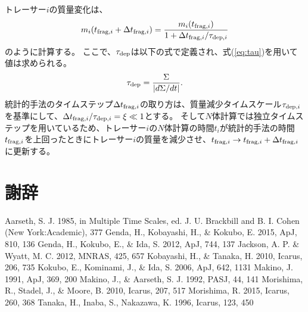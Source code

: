 \documentclass[a4paper,10pt,oneside,twocolumn,notitlepage,final]{jarticle}
\begin{document}
トレーサー$i$の質量変化は、
\begin{align}
 m_i(t_{{\rm frag},i} + \Delta t_{{\rm frag},i}) = \frac{m_i(t_{{\rm frag},i})}{1 + \Delta t_{{\rm frag},i}/\tau_{{\rm dep},i}}
\end{align}
のように計算する。
ここで、$\tau_{\rm dep}$は以下の式で定義され、式(\ref{eq:tau})を用いて値は求められる。
\begin{align}
 \tau_{\rm dep} = \frac{\Sigma}{|d \Sigma/ dt|}.
\end{align}
統計的手法のタイムステップ$\Delta t_{{\rm frag},i}$の取り方は、質量減少タイムスケール$\tau_{{\rm dep},i}$を基準にして、$\Delta t_{{\rm frag},i}/\tau_{{\rm dep},i} = \xi \ll 1$とする。
そして$N$体計算では独立タイムステップを用いているため、トレーサー$i$の$N$体計算の時間$t_i$が統計的手法の時間$t_{{\rm frag},i}$を上回ったときにトレーサー$i$の質量を減少させ、$t_{{\rm frag},i} \to t_{{\rm frag},i} + \Delta t_{{\rm frag},i}$に更新する。

\section*{謝辞}

\small
\begin{thebibliography}{99}
 Aarseth, S. J. 1985, in Multiple Time Scales, ed. J. U. Brackbill and B. I. Cohen (New York:Academic), 377
 Genda, H., Kobayashi, H., \& Kokubo, E. 2015, ApJ, 810, 136 
 Genda, H., Kokubo, E., \& Ida, S. 2012, ApJ, 744, 137
 Jackson, A. P. \& Wyatt, M. C. 2012, MNRAS, 425, 657
  Kobayashi, H., \& Tanaka, H. 2010, Icarus, 206, 735
  Kokubo, E., Kominami, J., \& Ida, S. 2006, ApJ, 642, 1131
 Makino, J. 1991, ApJ, 369, 200
 Makino, J., \& Aarseth, S. J. 1992, PASJ, 44, 141
  Morishima, R., Stadel, J., \& Moore, B. 2010, Icarus, 207, 517
 Morishima, R. 2015, Icarus, 260, 368
 Tanaka, H., Inaba, S., Nakazawa, K. 1996, Icarus, 123, 450
\end{thebibliography}
\end{document}
